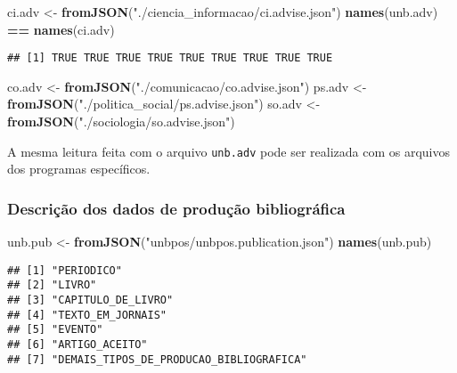\documentclass[]{article}
\newenvironment{Shaded}{\begin{snugshade}}{\end{snugshade}}
\newcommand{\KeywordTok}[1]{\textcolor[rgb]{0.13,0.29,0.53}{\textbf{#1}}}
\newcommand{\StringTok}[1]{\textcolor[rgb]{0.31,0.60,0.02}{#1}}
\newcommand{\OperatorTok}[1]{\textcolor[rgb]{0.81,0.36,0.00}{\textbf{#1}}}
\newcommand{\NormalTok}[1]{#1}
\begin{document}
\begin{Shaded}
\begin{Highlighting}[]
\NormalTok{ci.adv <-}\StringTok{ }\KeywordTok{fromJSON}\NormalTok{(}\StringTok{"./ciencia_informacao/ci.advise.json"}\NormalTok{)}
\KeywordTok{names}\NormalTok{(unb.adv) }\OperatorTok{==}\StringTok{ }\KeywordTok{names}\NormalTok{(ci.adv)}
\end{Highlighting}
\end{Shaded}

\begin{verbatim}
## [1] TRUE TRUE TRUE TRUE TRUE TRUE TRUE TRUE TRUE
\end{verbatim}

\begin{Shaded}
\begin{Highlighting}[]
\NormalTok{co.adv <-}\StringTok{ }\KeywordTok{fromJSON}\NormalTok{(}\StringTok{"./comunicacao/co.advise.json"}\NormalTok{)}
\NormalTok{ps.adv <-}\StringTok{ }\KeywordTok{fromJSON}\NormalTok{(}\StringTok{"./politica_social/ps.advise.json"}\NormalTok{)}
\NormalTok{so.adv <-}\StringTok{ }\KeywordTok{fromJSON}\NormalTok{(}\StringTok{"./sociologia/so.advise.json"}\NormalTok{)}
\end{Highlighting}
\end{Shaded}

A mesma leitura feita com o arquivo \texttt{unb.adv} pode ser realizada
com os arquivos dos programas específicos.

\subsubsection{Descrição dos dados de produção
bibliográfica}\label{descricao-dos-dados-de-producao-bibliografica}

\begin{Shaded}
\begin{Highlighting}[]
\NormalTok{unb.pub <-}\StringTok{ }\KeywordTok{fromJSON}\NormalTok{(}\StringTok{"unbpos/unbpos.publication.json"}\NormalTok{)}
\KeywordTok{names}\NormalTok{(unb.pub)}
\end{Highlighting}
\end{Shaded}

\begin{verbatim}
## [1] "PERIODICO"                             
## [2] "LIVRO"                                 
## [3] "CAPITULO_DE_LIVRO"                     
## [4] "TEXTO_EM_JORNAIS"                      
## [5] "EVENTO"                                
## [6] "ARTIGO_ACEITO"                         
## [7] "DEMAIS_TIPOS_DE_PRODUCAO_BIBLIOGRAFICA"
\end{verbatim}
\end{document}

